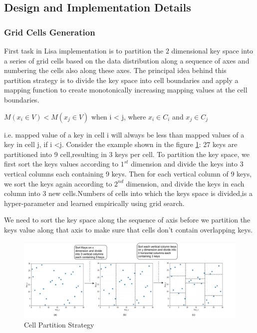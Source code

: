 \subsection{Design and Implementation Details}
\subsubsection{Grid Cells Generation} 
First task in Lisa implementation is to partition the $2$ dimensional key space into a series of grid cells based on the data distribution along a sequence of axes and numbering the cells also along these axes. The principal idea behind this partition strategy is to divide the key space into cell boundaries and apply a mapping function to create monotonically increasing mapping values at the cell boundaries. 

    $ M(x_{i} \in V) <  M(x_{j} \in V)$ when i < j, where $x_{i} \in C_{i}$ and $x_{j} \in C_{j}$ 
    
i.e. mapped value of a key in cell i will always be less than mapped values of a key in cell j, if i <j.
Consider the example shown in the figure \ref{fig:Cell_Parttion}: 27 keys are partitioned into 9 cell,resulting in 3 keys per cell. To partition the key space, we first sort the keys values according to $1^{st}$  dimension and divide the keys into 3 vertical columns each containing 9 keys. Then for each vertical column of 9 keys, we sort the keys again according to $2^{nd}$  dimension, and divide the keys in each column into 3 new cells.Numbers of cells into which the keys space is divided,is a hyper-parameter and learned empirically using grid search.

We need to sort the key space along the sequence of axis before we partition the keys value along that axis to make sure that cells don't contain overlapping keys. \\

\begin{figure}[t]
    \centering
    \includegraphics[width=1\textwidth]{graphs/Grid_Cell_Generation_Strategy_2.png}
    \caption{Cell Partition Strategy }
    \label{fig:Cell_Parttion}
\end{figure}



